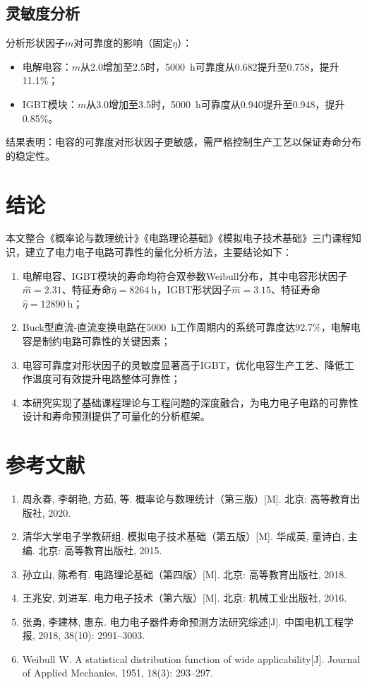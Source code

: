 \documentclass[12pt]{article}
\begin{document}
\subsection{灵敏度分析}
分析形状因子$m$对可靠度的影响（固定$\eta$）：
\begin{itemize}
    \item 电解电容：$m$从2.0增加至2.5时，\SI{5000}{\hour}可靠度从0.682提升至0.758，提升11.1\%；
    \item IGBT模块：$m$从3.0增加至3.5时，\SI{5000}{\hour}可靠度从0.940提升至0.948，提升0.85\%。
\end{itemize}

结果表明：电容的可靠度对形状因子更敏感，需严格控制生产工艺以保证寿命分布的稳定性。

\section{结论}
本文整合《概率论与数理统计》《电路理论基础》《模拟电子技术基础》三门课程知识，建立了电力电子电路可靠性的量化分析方法，主要结论如下：
\begin{enumerate}
    \item 电解电容、IGBT模块的寿命均符合双参数Weibull分布，其中电容形状因子$\hat{m}=2.31$、特征寿命$\hat{\eta}=\SI{8264}{\hour}$，IGBT形状因子$\hat{m}=3.15$、特征寿命$\hat{\eta}=\SI{12890}{\hour}$；
    \item Buck型直流-直流变换电路在\SI{5000}{\hour}工作周期内的系统可靠度达92.7\%，电解电容是制约电路可靠性的关键因素；
    \item 电容可靠度对形状因子的灵敏度显著高于IGBT，优化电容生产工艺、降低工作温度可有效提升电路整体可靠性；
    \item 本研究实现了基础课程理论与工程问题的深度融合，为电力电子电路的可靠性设计和寿命预测提供了可量化的分析框架。
\end{enumerate}

\newpage
\section*{参考文献}
\begin{enumerate}
    \item 周永春, 李朝艳, 方茹, 等. 概率论与数理统计（第三版）[M]. 北京: 高等教育出版社, 2020.
    \item 清华大学电子学教研组. 模拟电子技术基础（第五版）[M]. 华成英, 童诗白, 主编. 北京: 高等教育出版社, 2015.
    \item 孙立山, 陈希有. 电路理论基础（第四版）[M]. 北京: 高等教育出版社, 2018.
    \item 王兆安, 刘进军. 电力电子技术（第六版）[M]. 北京: 机械工业出版社, 2016.
    \item 张勇, 李建林, 惠东. 电力电子器件寿命预测方法研究综述[J]. 中国电机工程学报, 2018, 38(10): 2991–3003.
    \item Weibull W. A statistical distribution function of wide applicability[J]. Journal of Applied Mechanics, 1951, 18(3): 293–297.
\end{enumerate}
\end{document}
